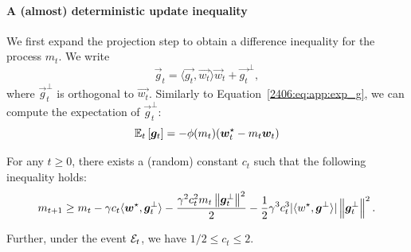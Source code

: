 \paragraph{A (almost) deterministic update inequality}

We first expand the projection step to obtain a difference inequality for the process $m_t$. We write 
\begin{equation}\label{2406:eq:app:grad_decomp}
    \vec{g}_t = \langle \vec{g_t}, \vec{w_t} \rangle \vec{w}_t + \vec{g_t}^\bot,
\end{equation}  
where $\vec{g}_t^\bot$ is orthogonal to $\vec{w_t}$. Similarly to Equation~\ref{2406:eq:app:exp_g}, we can compute the expectation of $\vec{g}_t^\bot$:
\begin{equation}\label{2406:eq:app:exp_gbot}
    \mathbb{E}_t\left[{\boldsymbol{g}}_t\right] = -\phi(m_t)({\boldsymbol{w}}_t^\star - m_t {\boldsymbol{w}}_t)
\end{equation}
\begin{lemma}\label{2406:lem:app:difference_m_determ}
For any $t \geq 0$, there exists a (random) constant $c_t$ such that the following inequality holds:
\begin{equation}
    m_{t+1} \geq m_t - \gamma c_t \langle {\boldsymbol{w}}^\star,{\boldsymbol{g}}_t^\bot \rangle - \frac{\gamma^2 c_t^2 m_t \left\lVert {\boldsymbol{g}}_t^\bot\right\rVert^2}{2} - \frac12\gamma^3 c_t^3 |\langle w^\star, {\boldsymbol{g}}^\bot \rangle| \left\lVert {\boldsymbol{g}}_t^\bot\right\rVert^2.
\end{equation}

Further, under the event $\mathcal{E}_t$, we have $1/2 \leq c_t \leq 2$.
\end{lemma}

